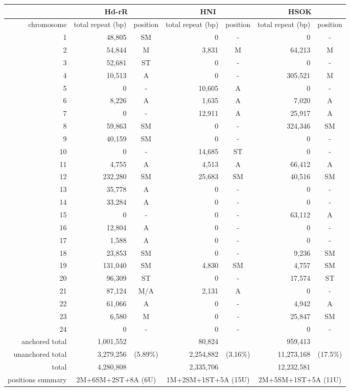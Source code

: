 \begin{tabular}{r|rc|rc|rc}
  \hline
  & \multicolumn{2}{c|}{Hd-rR} & \multicolumn{2}{c|}{HNI} & \multicolumn{2}{c}{HSOK} \\ \hline
  chromosome & total repeat (bp) & position & total repeat (bp) & position & total repeat (bp) & position \\ \hline
  1  & 48,805  & SM  & 0      & -  & 0       & -  \\
  2  & 54,844  & M   & 3,831  & M  & 64,213  & M  \\
  3  & 52,681  & ST  & 0      & -  & 0       & -  \\
  4  & 10,513  & A   & 0      & -  & 305,521 & M  \\
  5  & 0       & -   & 10,605 & A  & 0       & -  \\
  6  & 8,226   & A   & 1,635  & A  & 7,020   & A  \\
  7  & 0       & -   & 12,911 & A  & 25,917  & A  \\
  8  & 59,863  & SM  & 0      & -  & 324,346 & SM \\
  9  & 40,159  & SM  & 0      & -  & 0       & -  \\
  10 & 0       & -   & 14,685 & ST & 0       & -  \\
  11 & 4,755   & A   & 4,513  & A  & 66,412  & A  \\
  12 & 232,280 & SM  & 25,683 & SM & 40,516  & SM \\
  13 & 35,778  & A   & 0      & -  & 0       & -  \\
  14 & 33,284  & A   & 0      & -  & 0       & -  \\
  15 & 0       & -   & 0      & -  & 63,112  & A  \\
  16 & 12,804  & A   & 0      & -  & 0       & -  \\
  17 & 1,588   & A   & 0      & -  & 0       & -  \\
  18 & 23,853  & SM  & 0      & -  & 9,236   & SM \\
  19 & 131,040 & SM  & 4,830  & SM & 4,757   & SM \\
  20 & 96,309  & ST  & 0      & -  & 17,574  & ST \\
  21 & 87,124  & M/A & 2,131  & A  & 0       & -  \\
  22 & 61,066  & A   & 0      & -  & 4,942   & A  \\
  23 & 6,580   & M   & 0      & -  & 25,847  & SM \\
  24 & 0       & -   & 0      & -  & 0       & -  \\
  \hline
  anchored total & 1,001,552 &  & 80,824 &  & 959,413 \\
  unanchored total & 3,279,256 & (5.89\%) & 2,254,882 & (3.16\%) & 11,273,168 & (17.5\%) \\
  total & 4,280,808 &  & 2,335,706 &  & 12,232,581 \\
  \hline
  positions summary & \multicolumn{2}{c|}{2M+6SM+2ST+8A (6U)} & \multicolumn{2}{c|}{1M+2SM+1ST+5A (15U)} & \multicolumn{2}{c}{2M+5SM+1ST+5A (11U)} &
  \hline
\end{tabular}
